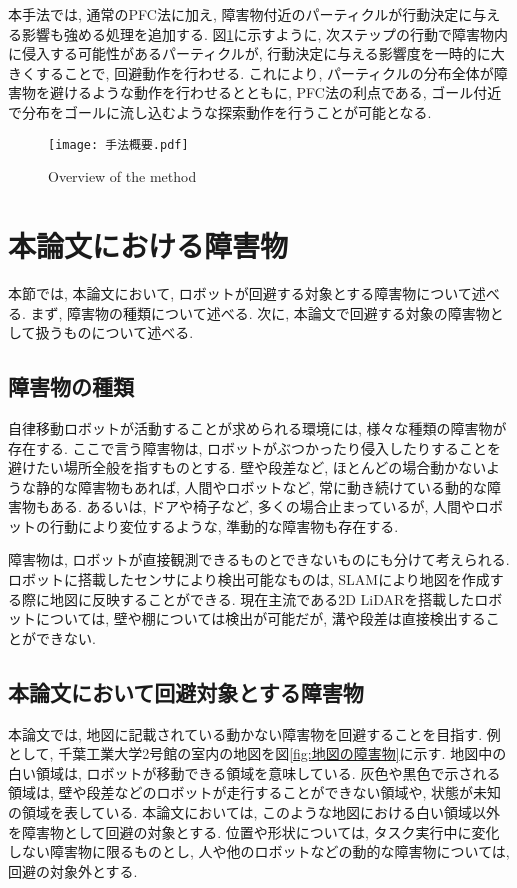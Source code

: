 本手法では, 通常のPFC法に加え, 障害物付近のパーティクルが行動決定に与える影響も強める処理を追加する. 
図\ref{fig:手法概要}に示すように, 次ステップの行動で障害物内に侵入する可能性があるパーティクルが, 
行動決定に与える影響度を一時的に大きくすることで, 回避動作を行わせる. 
これにより, パーティクルの分布全体が障害物を避けるような動作を行わせるとともに, 
PFC法の利点である, ゴール付近で分布をゴールに流し込むような探索動作を行うことが可能となる. 

\begin{figure}[h]
  \begin{center}
    \texttt{[image: 手法概要.pdf]}
    \caption{Overview of the method}
    \label{fig:手法概要}
  \end{center}
\end{figure}


\section{本論文における障害物} \label{section:障害物}
本節では, 本論文において, ロボットが回避する対象とする障害物について述べる. 
まず, 障害物の種類について述べる. 
次に, 本論文で回避する対象の障害物として扱うものについて述べる. 

\subsection{障害物の種類}
自律移動ロボットが活動することが求められる環境には, 様々な種類の障害物が存在する. 
ここで言う障害物は, ロボットがぶつかったり侵入したりすることを避けたい場所全般を指すものとする. 
壁や段差など, ほとんどの場合動かないような静的な障害物もあれば, 
人間やロボットなど, 常に動き続けている動的な障害物もある. 
あるいは, ドアや椅子など, 多くの場合止まっているが, 人間やロボットの行動により変位するような, 準動的な障害物も存在する. 

障害物は, ロボットが直接観測できるものとできないものにも分けて考えられる. 
ロボットに搭載したセンサにより検出可能なものは, SLAMにより地図を作成する際に地図に反映することができる. 
現在主流である2D LiDARを搭載したロボットについては, 壁や棚については検出が可能だが, 溝や段差は直接検出することができない. 

\subsection{本論文において回避対象とする障害物}
本論文では, 地図に記載されている動かない障害物を回避することを目指す. 
例として, 千葉工業大学2号館の室内の地図を図\ref{fig:地図の障害物}に示す. 
地図中の白い領域は, ロボットが移動できる領域を意味している. 
灰色や黒色で示される領域は, 壁や段差などのロボットが走行することができない領域や, 
状態が未知の領域を表している. 
本論文においては, このような地図における白い領域以外を障害物として回避の対象とする. 
位置や形状については, タスク実行中に変化しない障害物に限るものとし, 
人や他のロボットなどの動的な障害物については, 回避の対象外とする. 

